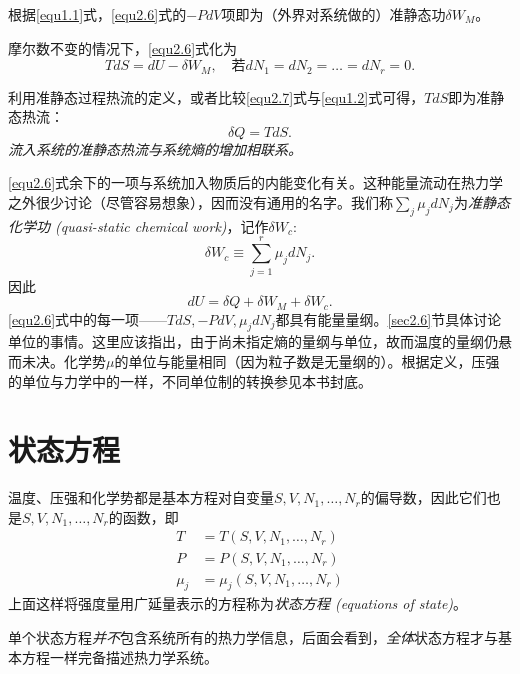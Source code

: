 根据\eqref{equ1.1}式，\eqref{equ2.6}式的$-P dV$项即为（外界对系统做的）准静态功$\delta W_M$。

摩尔数不变的情况下，\eqref{equ2.6}式化为
\begin{equation}
\label{equ2.7}
	T dS = dU - \delta W_M, \quad \text{若}dN_1 = dN_2 = \dots = dN_r = 0.
\end{equation}

利用准静态过程热流的定义，或者比较\eqref{equ2.7}式与\eqref{equ1.2}式可得，$TdS$即为准静态热流：
\begin{equation}
\label{equ2.8}
	\delta Q = TdS.
\end{equation}
{\it 流入系统的准静态热流与系统熵的增加相联系。}

\eqref{equ2.6}式余下的一项与系统加入物质后的内能变化有关。这种能量流动在热力学之外很少讨论（尽管容易想象），因而没有通用的名字。我们称$\sum_j \mu_j dN_j$为{\it 准静态化学功 (quasi-static chemical work)}，记作$\delta W_c$:
\begin{equation}
\label{equ2.9}
	\delta W_c \equiv \sum_{j = 1}^r \mu_j dN_j.
\end{equation}
因此
\begin{equation}
\label{equ2.10}
	dU = \delta Q + \delta W_M + \delta W_c.
\end{equation}
\eqref{equ2.6}式中的每一项——$TdS, -PdV, \mu_j dN_j$都具有能量量纲。\ref{sec2.6}节具体讨论单位的事情。这里应该指出，由于尚未指定熵的量纲与单位，故而温度的量纲仍悬而未决。化学势$\mu$的单位与能量相同（因为粒子数是无量纲的）。根据定义，压强的单位与力学中的一样，不同单位制的转换参见本书封底。

\section{状态方程}
\label{sec2.2}
温度、压强和化学势都是基本方程对自变量$S, V, N_1, \dots, N_r$的偏导数，因此它们也是$S, V, N_1, \dots, N_r$的函数，即
\begin{align}
\label{equ2.11}
	T &= T(S, V, N_1, \dots, N_r) \\
\label{equ2.12}
	P &= P(S, V, N_1, \dots, N_r) \\
\label{equ2.13}
	\mu_j &= \mu_j (S, V, N_1, \dots, N_r)
\end{align}
上面这样将强度量用广延量表示的方程称为{\it 状态方程 (equations of state)}。

单个状态方程{\it 并不}包含系统所有的热力学信息，后面会看到，{\it 全体}状态方程才与基本方程一样完备描述热力学系统。

